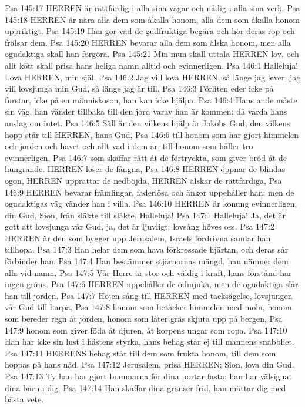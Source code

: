Psa 145:17  HERREN är rättfärdig i alla sina vägar och nådig i alla sina verk.
Psa 145:18  HERREN är nära alla dem som åkalla honom, alla dem som åkalla honom uppriktigt.
Psa 145:19  Han gör vad de gudfruktiga begära och hör deras rop och frälsar dem.
Psa 145:20  HERREN bevarar alla dem som älska honom, men alla ogudaktiga skall han förgöra.
Psa 145:21  Min mun skall uttala HERREN lov, och allt kött skall prisa hans heliga namn alltid och evinnerligen.
Psa 146:1  Halleluja! Lova HERREN, min själ.
Psa 146:2  Jag vill lova HERREN, så länge jag lever, jag vill lovsjunga min Gud, så länge jag är till.
Psa 146:3  Förliten eder icke på furstar, icke på en människoson, han kan icke hjälpa.
Psa 146:4  Hans ande måste sin väg, han vänder tillbaka till den jord varav han är kommen; då varda hans anslag om intet.
Psa 146:5  Säll är den vilkens hjälp är Jakobs Gud, den vilkens hopp står till HERREN, hans Gud,
Psa 146:6  till honom som har gjort himmelen och jorden och havet och allt vad i dem är, till honom som håller tro evinnerligen,
Psa 146:7  som skaffar rätt åt de förtryckta, som giver bröd åt de hungrande. HERREN löser de fångna,
Psa 146:8  HERREN öppnar de blindas ögon, HERREN upprättar de nedböjda, HERREN älskar de rättfärdiga,
Psa 146:9  HERREN bevarar främlingar, faderlösa och änkor uppehåller han; men de ogudaktigas väg vänder han i villa.
Psa 146:10  HERREN är konung evinnerligen, din Gud, Sion, från släkte till släkte. Halleluja!
Psa 147:1  Halleluja! Ja, det är gott att lovsjunga vår Gud, ja, det är ljuvligt; lovsång höves oss.
Psa 147:2  HERREN är den som bygger upp Jerusalem, Israels fördrivna samlar han tillhopa.
Psa 147:3  Han helar dem som hava förkrossade hjärtan, och deras sår förbinder han.
Psa 147:4  Han bestämmer stjärnornas mängd, han nämner dem alla vid namn.
Psa 147:5  Vår Herre är stor och väldig i kraft, hans förstånd har ingen gräns.
Psa 147:6  HERREN uppehåller de ödmjuka, men de ogudaktiga slår han till jorden.
Psa 147:7  Höjen sång till HERREN med tacksägelse, lovsjungen vår Gud till harpa,
Psa 147:8  honom som betäcker himmelen med moln, honom som bereder regn åt jorden, honom som låter gräs skjuta upp på bergen,
Psa 147:9  honom som giver föda åt djuren, åt korpens ungar som ropa.
Psa 147:10  Han har icke sin lust i hästens styrka, hans behag står ej till mannens snabbhet.
Psa 147:11  HERRENS behag står till dem som frukta honom, till dem som hoppas på hans nåd.
Psa 147:12  Jerusalem, prisa HERREN; Sion, lova din Gud.
Psa 147:13  Ty han har gjort bommarna för dina portar fasta; han har välsignat dina barn i dig.
Psa 147:14  Han skaffar dina gränser frid, han mättar dig med bästa vete.
